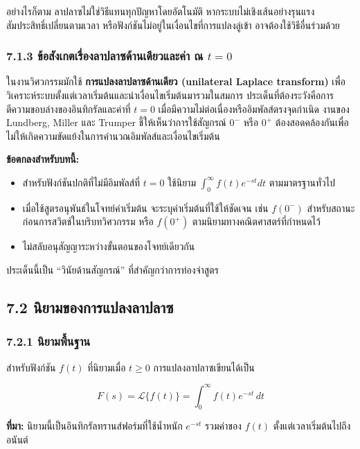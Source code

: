 อย่างไรก็ตาม ลาปลาซไม่ใช่วิธีแทนทุกปัญหาโดยอัตโนมัติ หากระบบไม่เชิงเส้นอย่างรุนแรง สัมประสิทธิ์เปลี่ยนตามเวลา หรือฟังก์ชันไม่อยู่ในเงื่อนไขที่การแปลงลู่เข้า อาจต้องใช้วิธีอื่นร่วมด้วย

\subsubsection{\texorpdfstring{7.1.3 ข้อสังเกตเรื่องลาปลาซด้านเดียวและค่า ณ $t=0$}{7.1.3 ข้อสังเกตเรื่องลาปลาซด้านเดียวและค่า ณ t=0}}

ในงานวิศวกรรมมักใช้ \textbf{การแปลงลาปลาซด้านเดียว (unilateral Laplace transform)} เพื่อวิเคราะห์ระบบตั้งแต่เวลาเริ่มต้นและนำเงื่อนไขเริ่มต้นมารวมในสมการ ประเด็นที่ต้องระวังคือการตีความขอบล่างของอินทิกรัลและค่าที่ $t=0$ เมื่อมีความไม่ต่อเนื่องหรืออิมพัลส์ตรงจุดกำเนิด งานของ Lundberg, Miller และ Trumper ชี้ให้เห็นว่าการใช้สัญกรณ์ $0^-$ หรือ $0^+$ ต้องสอดคล้องกันเพื่อไม่ให้เกิดความขัดแย้งในการคำนวณอิมพัลส์และเงื่อนไขเริ่มต้น

\textbf{ข้อตกลงสำหรับบทนี้:}

\begin{itemize}
    \item สำหรับฟังก์ชันปกติที่ไม่มีอิมพัลส์ที่ $t=0$ ใช้นิยาม $\int_0^\infty f(t)e^{-st}dt$ ตามมาตรฐานทั่วไป
    \item เมื่อใช้สูตรอนุพันธ์ในโจทย์ค่าเริ่มต้น จะระบุค่าเริ่มต้นที่ใช้ให้ชัดเจน เช่น $f(0^-)$ สำหรับสถานะก่อนการสวิตช์ในบริบทวิศวกรรม หรือ $f(0^+)$ ตามนิยามทางคณิตศาสตร์ที่กำหนดไว้
    \item ไม่สลับอนุสัญญาระหว่างขั้นตอนของโจทย์เดียวกัน
\end{itemize}

ประเด็นนี้เป็น “วินัยด้านสัญกรณ์” ที่สำคัญกว่าการท่องจำสูตร



\subsection{7.2 นิยามของการแปลงลาปลาซ}

\subsubsection{7.2.1 นิยามพื้นฐาน}

สำหรับฟังก์ชัน $f(t)$ ที่นิยามเมื่อ $t\ge 0$ การแปลงลาปลาซเขียนได้เป็น

\[
\boxed{F(s)=\mathcal{L}\{f(t)\}=\int_{0}^{\infty} f(t)e^{-st}\,dt}
\]

\textbf{ที่มา:} นิยามนี้เป็นอินทิกรัลทรานส์ฟอร์มที่ใช้น้ำหนัก $e^{-st}$ รวมค่าของ $f(t)$ ตั้งแต่เวลาเริ่มต้นไปถึงอนันต์

